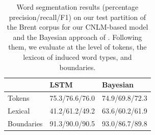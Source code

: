 %

\begin{table}[t]
  \begin{small}
    \begin{center}
      \begin{tabular}{l|ll}
        &	     LSTM & Bayesian \\ \hline %
        Tokens & 75.3/76.6/76.0 & 74.9/69.8/72.3 \\
        Lexical & 41.2/61.2/49.2 & 63.6/60.2/61.9 \\
        Boundaries & 91.3/90.0/90.5 & 93.0/86.7/89.8 \\
      \end{tabular}
    \end{center}
  \end{small}
  \caption{\label{tab:segmentation-results-brent} Word segmentation results (percentage precision/recall/F1) on our test partition of the Brent corpus for our CNLM-based model and the Bayesian approach of . Following them, we evaluate at the level of tokens, the lexicon of induced word types, and boundaries.}
\end{table}



